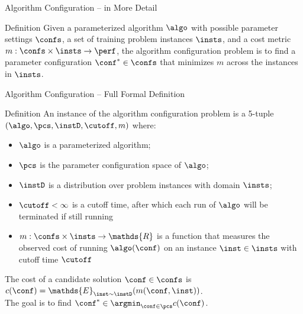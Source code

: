 \begin{frame}[c]{Algorithm Configuration -- in More Detail}

\bigskip

\centering
\scalebox{0.75}{
	
}

\bigskip

\begin{block}{Definition}
	Given a parameterized algorithm $\algo$ with possible parameter settings $\confs$, \pause 
	a set of training problem instances $\insts$, \pause 
	and a cost metric $m: \confs \times \insts \rightarrow \perf$, \pause 
	the algorithm configuration problem is 
	to \alert{find a parameter configuration $\conf^* \in \confs$ 
		that minimizes $m$ across the instances in $\insts$}.
\end{block}

\end{frame}


\begin{frame}[c]{Algorithm Configuration -- Full Formal Definition}

\begin{block}{Definition}
An instance of the algorithm configuration problem
is a 5-tuple $(\algo, \pcs, \instD, \cutoff, m)$ where:
\begin{itemize}
	\item $\algo$ is a parameterized algorithm;
	\item $\pcs$ is the parameter configuration space of $\algo$;
	\item $\instD$ is a distribution over problem instances with domain $\insts$;
	\pause
	\item $\cutoff < \infty$ is a \alert{cutoff time}, after which each run of $\algo$ will be terminated if still running
	\pause
	\item $m: \confs \times \insts \rightarrow \mathds{R}$ is a function that
	measures the observed cost of running $\algo(\conf)$ on an instance $\inst \in
	\insts$ with cutoff time $\cutoff$ 
\end{itemize}
\pause
The cost of a candidate solution $\conf\in\confs$ is
\alert{$c(\conf) = \mathds{E}_{\inst \sim \instD} (m(\conf,\inst))$}.\\
The goal is to find \alert{$\conf^* \in \argmin_{\conf \in \pcs} c(\conf)$}.

\end{block}

\end{frame}

